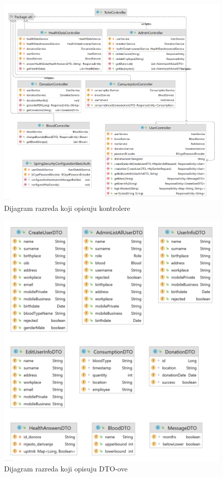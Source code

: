 	
\begin{figure}[H]
	\centering
	\includegraphics[width=\textwidth, scale=0.5]{dijagrami/dijagram_razreda3}
	\caption{Dijagram razreda koji opisuju kontrolere}
	\label{fig:dijagram_kontrolera}
\end{figure}

\begin{figure}[H]
	\centering
	\includegraphics[width=\textwidth, scale=0.5]{dijagrami/dijagram_razreda4}
	\caption{Dijagram razreda koji opisuju DTO-ove}
	\label{fig:dijagram_DTO}
\end{figure}

